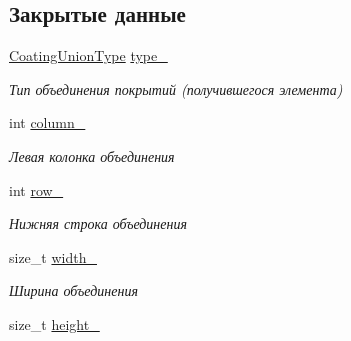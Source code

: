 \subsection*{Закрытые данные}
\begin{DoxyCompactItemize}
\item 
\mbox{\label{classrtm_1_1_coating_union_ab8fd79074da6b4915bbbaec93befc0f0}} 
\hyperlink{namespacertm_a6a0d424be5696f64038e5e84a79cabfa}{Coating\+Union\+Type} \hyperlink{classrtm_1_1_coating_union_ab8fd79074da6b4915bbbaec93befc0f0}{type\+\_\+}
\begin{DoxyCompactList}\small\item\em Тип объединения покрытий (получившегося элемента) \end{DoxyCompactList}\item 
\mbox{\label{classrtm_1_1_coating_union_aef5f5d3f4ac06044fe4482bf60b01e77}} 
int \hyperlink{classrtm_1_1_coating_union_aef5f5d3f4ac06044fe4482bf60b01e77}{column\+\_\+}
\begin{DoxyCompactList}\small\item\em Левая колонка объединения \end{DoxyCompactList}\item 
\mbox{\label{classrtm_1_1_coating_union_aa7133c7a2059495ab4c02b1813e8abfb}} 
int \hyperlink{classrtm_1_1_coating_union_aa7133c7a2059495ab4c02b1813e8abfb}{row\+\_\+}
\begin{DoxyCompactList}\small\item\em Нижняя строка объединения \end{DoxyCompactList}\item 
\mbox{\label{classrtm_1_1_coating_union_acab8ed30a66c786a3ac7d0edff914dbc}} 
size\+\_\+t \hyperlink{classrtm_1_1_coating_union_acab8ed30a66c786a3ac7d0edff914dbc}{width\+\_\+}
\begin{DoxyCompactList}\small\item\em Ширина объединения \end{DoxyCompactList}\item 
\mbox{\label{classrtm_1_1_coating_union_abd65484b95a4b62e1c22146cb2a9d542}} 
size\+\_\+t \hyperlink{classrtm_1_1_coating_union_abd65484b95a4b62e1c22146cb2a9d542}{height\+\_\+}

\end{DoxyCompactItemize}
